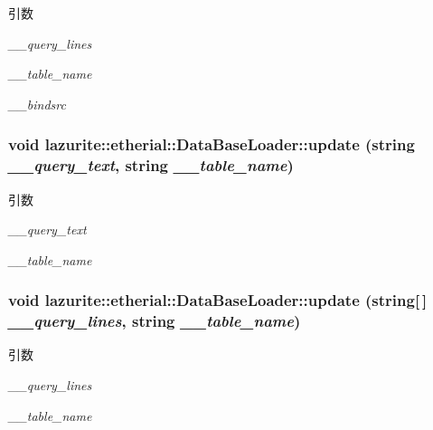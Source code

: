 \begin{DoxyParams}{引数}
\item[{\em \_\-\_\-query\_\-lines}]\item[{\em \_\-\_\-table\_\-name}]\item[{\em \_\-\_\-bindsrc}]\end{DoxyParams}
\hypertarget{classlazurite_1_1etherial_1_1_data_base_loader_ad1581f164cdf6a476d1bc1287169ea80}{
\subsubsection[{update}]{\setlength{\rightskip}{0pt plus 5cm}void lazurite::etherial::DataBaseLoader::update (string {\em \_\-\_\-query\_\-text}, \/  string {\em \_\-\_\-table\_\-name})}}
\label{classlazurite_1_1etherial_1_1_data_base_loader_ad1581f164cdf6a476d1bc1287169ea80}

\begin{DoxyParams}{引数}
\item[{\em \_\-\_\-query\_\-text}]\item[{\em \_\-\_\-table\_\-name}]\end{DoxyParams}
\hypertarget{classlazurite_1_1etherial_1_1_data_base_loader_a3f5190a29a3e7c70ff4411ad671a5cc6}{
\subsubsection[{update}]{\setlength{\rightskip}{0pt plus 5cm}void lazurite::etherial::DataBaseLoader::update (string\mbox{[}$\,$\mbox{]} {\em \_\-\_\-query\_\-lines}, \/  string {\em \_\-\_\-table\_\-name})}}
\label{classlazurite_1_1etherial_1_1_data_base_loader_a3f5190a29a3e7c70ff4411ad671a5cc6}

\begin{DoxyParams}{引数}
\item[{\em \_\-\_\-query\_\-lines}]\item[{\em \_\-\_\-table\_\-name}]\end{DoxyParams}


